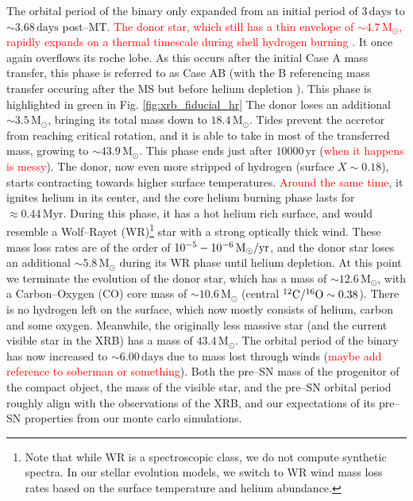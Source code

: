 \documentclass[linenumbers,trackchanges,twocolumn]{aastex701}
\newcommand{\Mdot}{\mathrm{M}_{\odot}}
\newcommand{\red}{\textcolor{red}}
\begin{document}
The orbital period of the binary only expanded from an initial period of $3\,\mathrm{days}$ to $\sim 3.68\,\mathrm{days}$ post--MT. \red{The donor star, which still has a thin envelope of $\sim 4.7\,\Mdot$, rapidly expands on a thermal timescale during shell hydrogen burning \citep{2017A&A...608A..11G}.} It once again overflows its roche lobe. As this occurs after the initial Case A mass transfer, this phase is referred to as Case AB (with the B referencing mass transfer occuring after the MS but before helium depletion \cite{1967ZA.....65..251K}). This phase is highlighted in green in Fig. \ref{fig:xrb_fiducial_hr} The donor loses an additional $\sim 3.5\,\Mdot$, bringing its total mass down to $18.4\,\Mdot$. Tides prevent the accretor from reaching critical rotation, and it is able to take in most of the transferred mass, growing to $\sim 43.9\,\Mdot$. This phase ends just after $10000\, \mathrm{yr}$ (\red{when it happens is messy}).  The donor, now even more stripped of hydrogen (surface $X \sim 0.18$), starts contracting towards higher surface temperatures. \red{Around the same time}, it ignites helium in its center, and the core helium burning phase lasts for $\approx 0.44\,\mathrm{Myr}$. During this phase, it has a hot helium rich surface, and would resemble a Wolf--Rayet (WR)\footnote{Note that while WR is a spectroscopic class, we do not compute synthetic spectra. In our stellar evolution models, we switch to WR wind mass loss rates based on the surface temperature and helium abundance.} star with a strong optically thick wind. These mass loss rates are of the order of $10^{-5} - 10^{-6} \,\Mdot/\rm yr$, and the donor star loses an additional $\sim 5.8\,\Mdot$ during its WR phase until helium depletion. At this point we terminate the evolution of the donor star, which has a mass of $\sim 12.6\,\Mdot$, with a Carbon--Oxygen (CO) core mass of $\sim 10.6\,\Mdot$ (central $\rm ^{12}C/^{16}O \sim 0.38$). There is no hydrogen left on the surface, which now mostly consists of helium, carbon and some oxygen. Meanwhile, the originally less massive star (and the current visible star in the XRB) has a mass of $43.4\,\Mdot$. The orbital period of the binary has now increased to $\sim 6.00\,\mathrm{days}$ due to mass lost through winds (\red{maybe add reference to soberman or something}). Both the pre--SN mass of the progenitor of the compact object, the mass of the visible star, and the pre--SN orbital period roughly align with the observations of the XRB, and our expectations of its pre--SN properties from our monte carlo simulations.
\end{document}
